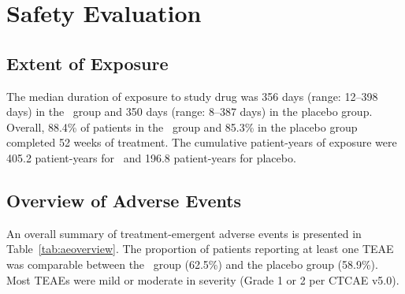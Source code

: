 \section{Safety Evaluation}

\subsection{Extent of Exposure}

The median duration of exposure to study drug was 356 days (range: 12--398 days) in the \studydrug\ group and 350 days (range: 8--387 days) in the placebo group. Overall, 88.4\% of patients in the \studydrug\ group and 85.3\% in the placebo group completed 52 weeks of treatment. The cumulative patient-years of exposure were 405.2 patient-years for \studydrug\ and 196.8 patient-years for placebo.

\subsection{Overview of Adverse Events}

An overall summary of treatment-emergent adverse events is presented in Table~\ref{tab:aeoverview}. The proportion of patients reporting at least one TEAE was comparable between the \studydrug\ group (62.5\%) and the placebo group (58.9\%). Most TEAEs were mild or moderate in severity (Grade 1 or 2 per CTCAE v5.0).

